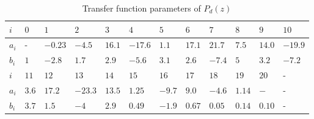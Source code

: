 \begin{table}[h!]
  \centering
  \begin{tabular}{| l | l | l | l | l | l | l | l | l | l | l | l |}
    \hline
    $i$   & $0$ & $1$ & $2$ & $3$ & $4$ & $5$ & $6$ & $7$ & $8$ & $9$ & $10$\\ \hline
    $a_i$ & -   & $-0.23$ & $-4.5$ & $16.1$ & $-17.6$ & $1.1$ & $17.1$ & $21.7$ & $7.5$ & $14.0$ & $-19.9$\\
    $b_i$ & $1$ & $-2.8$ & $1.7$ & $2.9$ & $-5.6$ & $3.1$ & $2.6$ & $-7.4$ & $5$ & $3.2$ & $-7.2$ \\ \hline
    $i$   & $11$ & $12$ & $13$ & $14$ & $15$ & $16$ & $17$ & $18$ & $19$ & $20$ & -\\ \hline
    $a_i$ & $3.6$ & $17.2$ & $-23.3$ & $13.5$ & $1.25$ & $-9.7$ & $9.0$ & $-4.6$ & $1.14$ & $-$ & - \\
    $b_i$ & $3.7$ & $1.5$ & $-4$ & $2.9$ & $0.49$ & $-1.9$ & $0.67$ & $0.05$ & $0.14$ & $0.10$ & - \\
    \hline
  \end{tabular}
  \caption{\label{tab:fdc_param} Transfer function parameters of $P_d(z)$}
\end{table}

